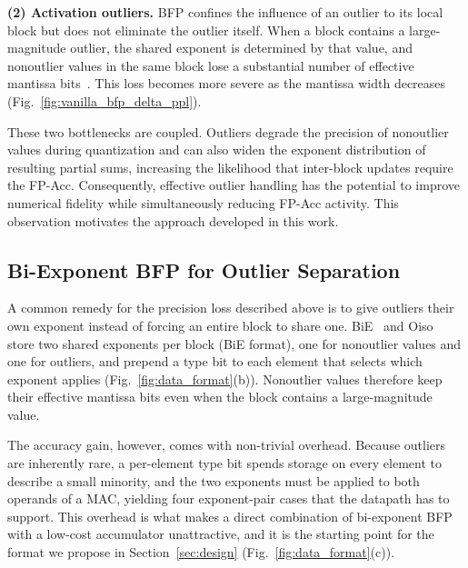 \textbf{(2) Activation outliers.}
BFP confines the influence of an outlier to its local block but does not eliminate the outlier itself.
When a block contains a large-magnitude outlier, the shared exponent is determined by that value, and nonoutlier values in the same block lose a substantial number of effective mantissa bits~\cite{bie2024,ees2025,oiso2026,bbal2025,harmonia2026}.
This loss becomes more severe as the mantissa width decreases (Fig.~\ref{fig:vanilla_bfp_delta_ppl}).

These two bottlenecks are coupled.
Outliers degrade the precision of nonoutlier values during quantization and can also widen the exponent distribution of resulting partial sums, increasing the likelihood that inter-block updates require the FP-Acc.
Consequently, effective outlier handling has the potential to improve numerical fidelity while simultaneously reducing FP-Acc activity.
This observation motivates the approach developed in this work.

\subsection{Bi-Exponent BFP for Outlier Separation}
\label{subsec:bie}
A common remedy for the precision loss described above is to give outliers their own exponent instead of forcing an entire block to share one.
BiE~\cite{bie2024} and Oiso~\cite{oiso2026} store two shared exponents per block (BiE format), one for nonoutlier values and one for outliers, and prepend a type bit to each element that selects which exponent applies (Fig.~\ref{fig:data_format}(b)).
Nonoutlier values therefore keep their effective mantissa bits even when the block contains a large-magnitude value.

The accuracy gain, however, comes with non-trivial overhead.
Because outliers are inherently rare, a per-element type bit spends storage on every element to describe a small minority, and the two exponents must be applied to both operands of a MAC, yielding four exponent-pair cases that the datapath has to support.
This overhead is what makes a direct combination of bi-exponent BFP with a low-cost accumulator unattractive, and it is the starting point for the format we propose in Section~\ref{sec:design} (Fig.~\ref{fig:data_format}(c)).
